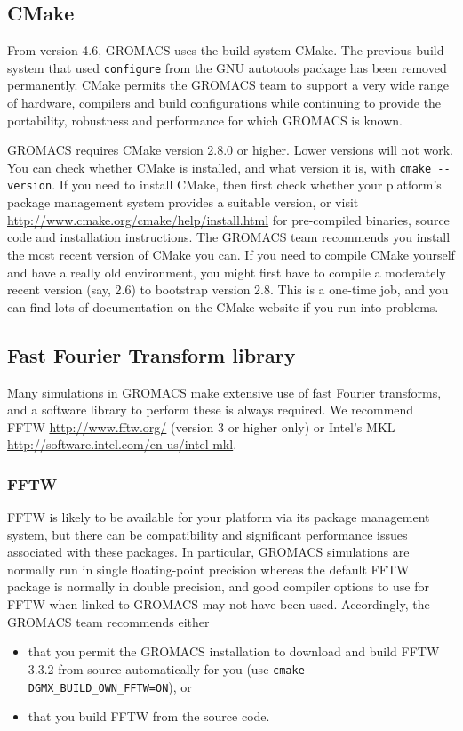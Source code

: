\documentclass{article}[12pt,a4paper,twoside]
\newcommand{\gromacs}{GROMACS}
\newcommand{\fftw}{FFTW}
\newcommand{\mkl}{MKL}
\newcommand{\cmake}{CMake}
\newcommand{\fftwversion}{3.3.2}
\newcommand{\cmakeversion}{2.8.0}
\begin{document}
\subsection{CMake}

From version 4.6, \gromacs{} uses the build system
\cmake{}. The previous build system that used \verb+configure+ from
the GNU autotools package has been removed permanently. \cmake{}
permits the \gromacs{} team to support a very wide range of hardware,
compilers and build configurations while continuing to provide the
portability, robustness and performance for which \gromacs{} is known.

\gromacs{} requires \cmake{} version \cmakeversion{} or higher. Lower
versions will not work. You can check whether \cmake{} is installed,
and what version it is, with \verb+cmake --version+. If you need to
install \cmake{}, then first check whether your platform's package
management system provides a suitable version, or visit
\url{http://www.cmake.org/cmake/help/install.html} for pre-compiled
binaries, source code and installation instructions. The \gromacs{}
team recommends you install the most recent version of \cmake{} you
can. If you need to compile \cmake{} yourself and have a really old environment,
you might first have to compile a moderately recent version (say, 2.6) to
bootstrap version 2.8. This is a one-time job, and you can find lots of
documentation on the \cmake{} website if you run into problems.

\subsection{Fast Fourier Transform library}

Many simulations in \gromacs{} make extensive use of fast Fourier transforms,
and a software library to perform these is always required. We
recommend \fftw{} \url{http://www.fftw.org/} (version 3 or higher
only) or Intel's \mkl{} \url{http://software.intel.com/en-us/intel-mkl}. 

\subsubsection{\fftw{}}

\fftw{} is likely to be available for your platform via its package
management system, but there can be compatibility and significant
performance issues associated with these packages. In particular,
\gromacs{} simulations are normally run in single floating-point
precision whereas the default \fftw{} package is normally in double
precision, and good compiler options to use for \fftw{} when linked to
\gromacs{} may not have been used. Accordingly, the \gromacs{} team
recommends either
\begin{itemize}
\item that you permit the \gromacs{} installation to download and
  build \fftw{} \fftwversion{} from source automatically for you (use
  \verb+cmake -DGMX_BUILD_OWN_FFTW=ON+), or
\item that you build \fftw{} from the source code.
\end{itemize}
\end{document}
